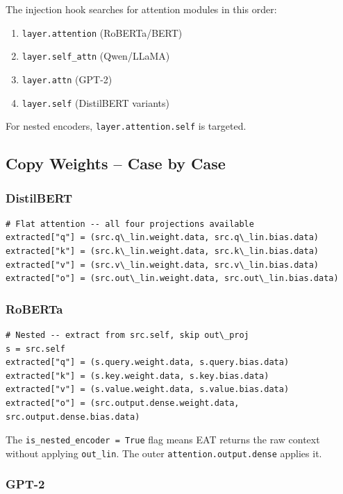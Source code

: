 The injection hook searches for attention modules in this order:

\begin{enumerate}
\item \texttt{layer.attention} (RoBERTa/BERT)
\item \texttt{layer.self\_attn} (Qwen/LLaMA)
\item \texttt{layer.attn} (GPT-2)
\item \texttt{layer.self} (DistilBERT variants)

\end{enumerate}
For nested encoders, \texttt{layer.attention.self} is targeted.

\subsection{Copy Weights -- Case by Case}

\subsubsection{DistilBERT}

\begin{lstlisting}
# Flat attention -- all four projections available
extracted["q"] = (src.q\_lin.weight.data, src.q\_lin.bias.data)
extracted["k"] = (src.k\_lin.weight.data, src.k\_lin.bias.data)
extracted["v"] = (src.v\_lin.weight.data, src.v\_lin.bias.data)
extracted["o"] = (src.out\_lin.weight.data, src.out\_lin.bias.data)
\end{lstlisting}

\subsubsection{RoBERTa}

\begin{lstlisting}
# Nested -- extract from src.self, skip out\_proj
s = src.self
extracted["q"] = (s.query.weight.data, s.query.bias.data)
extracted["k"] = (s.key.weight.data, s.key.bias.data)
extracted["v"] = (s.value.weight.data, s.value.bias.data)
extracted["o"] = (src.output.dense.weight.data, src.output.dense.bias.data)
\end{lstlisting}

The \texttt{is\_nested\_encoder = True} flag means EAT returns the raw context 
without applying \texttt{out\_lin}. The outer \texttt{attention.output.dense} applies it.

\subsubsection{GPT-2}

